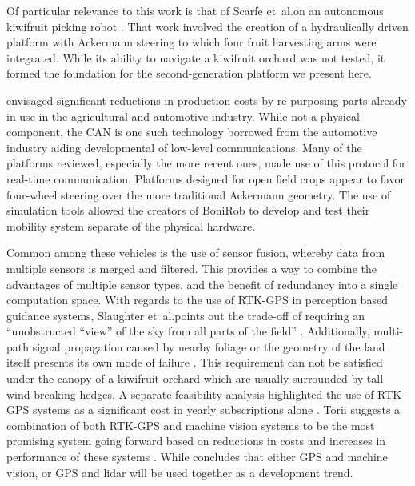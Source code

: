 \documentclass[preprint,authoryear,12pt]{elsarticle}
\begin{document}
        Of particular relevance to this work is that of Scarfe et~al.\@ on an autonomous kiwifruit picking robot \citep{scarfe2009, Scarfe2012}.
        That work involved the creation of a hydraulically driven platform with Ackermann steering to which four fruit harvesting arms were integrated.
        While its ability to navigate a kiwifruit orchard was not tested, it formed the foundation for the second-generation platform we present here.

        \cite{Blackmore2007} envisaged significant reductions in production costs by re-purposing parts already in use in the agricultural and automotive industry.
        While not a physical component, the CAN is one such technology borrowed from the automotive industry aiding developmental of low-level communications.
        Many of the platforms reviewed, especially the more recent ones, made use of this protocol for real-time communication.
        Platforms designed for open field crops appear to favor four-wheel steering over the more traditional Ackermann geometry.
        The use of simulation tools allowed the creators of BoniRob to develop and test their mobility system separate of the physical hardware.

        Common among these vehicles is the use of sensor fusion, whereby data from multiple sensors is merged and filtered.
        This provides a way to combine the advantages of multiple sensor types, and the benefit of redundancy  into a single computation space.
        With regards to the use of RTK-GPS in perception based guidance systems, Slaughter et~al.\@ points out the trade-off of requiring an ``unobstructed ``view'' of the sky from all parts of the field'' \citep{Slaughter2008}.
        Additionally, multi-path signal propagation caused by nearby foliage or the geometry of the land itself presents its own mode of failure \citep{Durrant-Whyte2005}.
        This requirement can not be satisfied under the canopy of a kiwifruit orchard which are usually surrounded by tall wind-breaking hedges.
        A separate feasibility analysis highlighted the use of RTK-GPS systems as a significant cost in yearly subscriptions alone \citep{Pedersen2006}.
        Torii suggests a combination of both RTK-GPS and machine vision systems to be the most promising system going forward based on reductions in costs and increases in performance of these systems \cite{Torii2000}.
        While \cite{Li2009} concludes that either GPS and machine vision, or GPS and lidar will be used together as a development trend.
\end{document}
